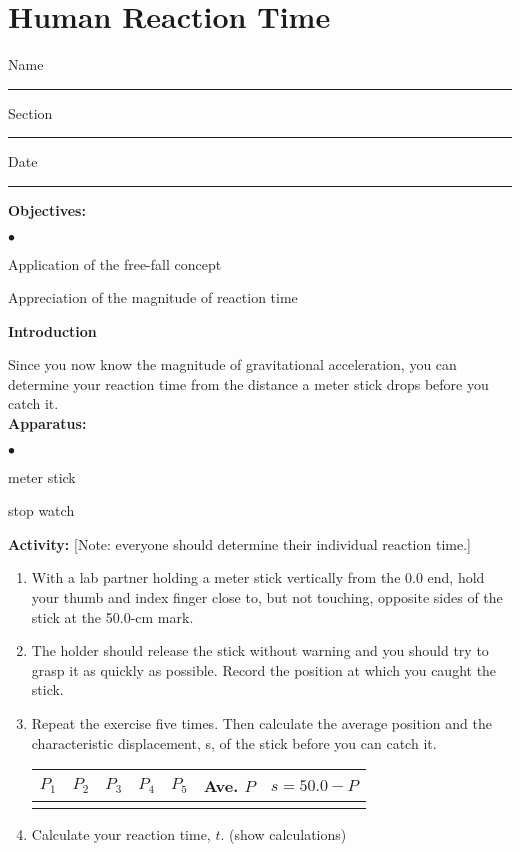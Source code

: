 
\section{Human Reaction Time}

Name \rule{2.0in}{0.1pt}\hfill{}Section \rule{1.0in}{0.1pt}\hfill{}Date \rule{1.0in}{0.1pt}

{\noindent \bf Objectives:} \begin{list}{$\bullet$}{\itemsep0pt }

\item Application of the free-fall concept \item Appreciation of the magnitude of reaction time

\end{list}

{\noindent \bf Introduction}

{\noindent Since you now know the magnitude of gravitational acceleration, you can determine your reaction time from the distance a meter stick drops before you catch it.} \\

{\noindent \bf Apparatus:} \begin{list}{$\bullet$}{\itemsep0pt }

\item meter stick \item stop watch

\end{list}

{\noindent \bf Activity:} [Note: everyone should determine their individual reaction time.]

\begin{enumerate}

\item With a lab partner holding a meter stick vertically from the 0.0 end, hold your thumb and index finger close to, but not touching, opposite sides of the stick at the 50.0-cm mark.

\item The holder should release the stick without warning and you should try to grasp it as quickly as possible. Record the position at which you caught the stick.

\item Repeat the exercise five times. Then calculate the average position and the characteristic displacement, s, of the stick before you can catch it.

\begin{center} \begin{tabular}{|c|c|c|c|c|c|c|} \hline $P_1$ & $P_2$ & $P_3$ & $P_4$ & $P_5$ & Ave. $P$ & $s = 50.0 - P$ \\ \hline \hline & & & & & & \\ \hline \end{tabular} \end{center}

\item Calculate your reaction time, $t$. (show calculations)

\bigskip \bigskip

 \end{enumerate}

